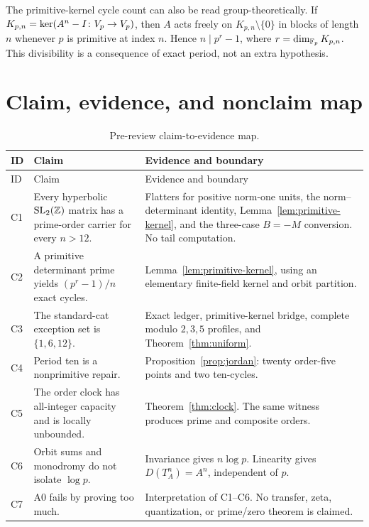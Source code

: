 \documentclass[11pt]{article}
\theoremstyle{definition}
\theoremstyle{remark}
\begin{document}
The primitive-kernel cycle count can also be read group-theoretically.  If
\(K_{p,n}=\operatorname{ker}(A^n-I\colon V_p\to V_p)\), then \(A\) acts freely on
\(K_{p,n}\setminus\{0\}\) in blocks of length \(n\) whenever \(p\) is
primitive at index \(n\).  Hence \(n\mid p^r-1\), where
\(r=\dim_{\mathbb{F}_p}K_{p,n}\).  This divisibility is a consequence of exact
period, not an extra hypothesis.

\section{Claim, evidence, and nonclaim map}
\label{app:claim-map}

\begin{longtable}{@{}p{}p{}p{}@{}}
\caption{Pre-review claim-to-evidence map.}\label{tab:claim-map}\\
\toprule
ID & Claim & Evidence and boundary \\
\midrule
\endfirsthead
\toprule
ID & Claim & Evidence and boundary \\
\midrule
\endhead
C1 & Every hyperbolic \(\mathrm{SL}_2(\mathbb{Z})\) matrix has a prime-order carrier for
every \(n>12\). & Flatters for positive norm-one units, the
norm--determinant identity, Lemma~\ref{lem:primitive-kernel}, and the
three-case \(B=-M\) conversion.  No tail computation. \\
C2 & A primitive determinant prime yields \((p^r-1)/n\) exact cycles. &
Lemma~\ref{lem:primitive-kernel}, using an elementary finite-field kernel and orbit
partition. \\
C3 & The standard-cat exception set is \(\{1,6,12\}\). & Exact ledger,
primitive-kernel bridge, complete modulo \(2,3,5\) profiles, and
Theorem~\ref{thm:uniform}. \\
C4 & Period ten is a nonprimitive repair. & Proposition~\ref{prop:jordan}:
twenty order-five points and two ten-cycles. \\
C5 & The order clock has all-integer capacity and is locally unbounded. &
Theorem~\ref{thm:clock}.  The same witness produces prime and composite
orders. \\
C6 & Orbit sums and monodromy do not isolate \(\log p\). & Invariance gives
\(n\log p\).  Linearity gives \(D(T_A^n)=A^n\), independent of \(p\). \\
C7 & A0 fails by proving too much. & Interpretation of C1--C6.  No transfer,
zeta, quantization, or prime/zero theorem is claimed. \\
\bottomrule
\end{longtable}
\end{document}
